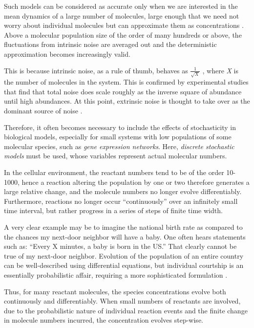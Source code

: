 \documentclass[12pt,a4paper]{report}
\begin{document}
Such models can be considered as accurate only when we are interested in the mean dynamics of a large number of molecules, large enough that we need not worry about individual molecules but can approximate them as concentrations \cite{Article}. Above a molecular population size of the order of many hundreds or above, the fluctuations from intrinsic noise are averaged out and the deterministic approximation becomes increasingly valid.

This is because intrinsic noise, as a rule of thumb, behaves as $\frac{1}{\sqrt{X}}$ , where \emph{X} is the number of molecules in the system. This is confirmed by experimental studies that find that total noise does scale roughly as the inverse square of abundance until high abundances. At this point, extrinsic noise is thought to take over as the dominant source of noise \cite{noisewithabundance}.

Therefore, it often becomes necessary to include the effects of stochasticity in biological models, especially for small systems with low populations of some molecular species, such as \emph{gene expression networks}. Here, \emph{discrete stochastic models} must be used, whose variables represent actual molecular numbers.

In the cellular environment, the reactant numbers tend to be of the order 10-1000, hence a reaction altering the population by one or two therefore generates a large relative change, and the molecule numbers no longer evolve differentiably. Furthermore, reactions no longer occur ``continuously'' over an infinitely small time interval, but rather progress in a series of steps of finite time width.

A very clear example may be to imagine the national birth rate as compared to the chances my next-door neighbor will have a baby. One often hears statements such as: ``Every X minutes, a baby is born in the US.'' That clearly cannot be true of my next-door neighbor. Evolution of the population of an entire country can be well-described using differential equations, but individual courtship is an essentially probabilistic affair, requiring a more sophisticated formulation \cite{SanDiegoUniversity}.

Thus, for many reactant molecules, the species concentrations evolve both continuously and differentiably. When
small numbers of reactants are involved, due to the probabilistic nature of individual reaction events and the finite change in molecule numbers incurred, the concentration evolves step-wise.
\end{document}
